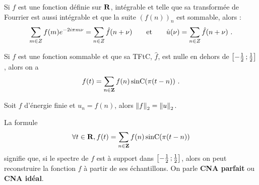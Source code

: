 \begin{thm}
	Si $f$ est une fonction définie sur $\mathbf{R}$, intégrable et telle que sa transformée de Fourrier est aussi intégrable et que la suite $(f(n))_n$ est sommable, alors :
	\vspace{-0.1cm}$$
	\sum_{m\in Z} f(m)e^{-2i\pi m\nu } = \sum_{n\in Z} \hat{f}(n+\nu )
	\qquad \text{et} \qquad
	\hat{u}(\nu ) = \sum_{n\in Z} \hat{f}(n+\nu )\ .
	\vspace{-0.1cm}$$
\end{thm}

\begin{thm}
	Si $f$ est une fonction sommable et que sa TFtC, $\hat{f}$, est nulle en dehors de $\mathopen{}\mathclose{\left[-\frac{1}{2}\mathclose{}\mathpunct{};\frac{1}{2}\right]}$, alors on a
	\vspace{-0.15cm}$$
	f(t)=\sum_{n\in \Z} f(n) \sinC (\pi (t-n))\ .
	\vspace{-0.15cm}$$
\end{thm}

\begin{thm}
	Soit $f$ d'énergie finie et $u_{n} = f(n)$, alors $\left\lVert f\right\rVert_{2} = \left\lVert u\right\rVert_{2}$.
\end{thm}

\begin{defn} La formule
	$$\forall t \in \mathbf{R}, f(t) = \sum_{n\in \mathbf{Z}} f(n) \operatorname{sinC} (\pi (t-n))$$
	signifie que, si le spectre de $f$ est à support dans $\mathopen{}\mathclose{\left[-\frac{1}{2}\mathclose{}\mathpunct{};\frac{1}{2}\right]}$, alors on peut reconstruire la fonction $f$ à partir de ses échantillons.
	On parle \textbf{CNA parfait} ou \textbf{CNA idéal}.
\end{defn}
